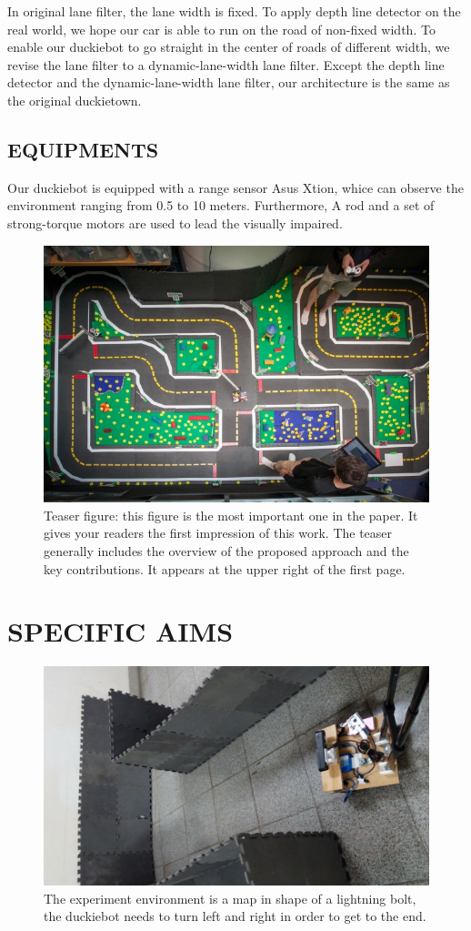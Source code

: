 \documentclass[letterpaper, 10 pt, conference]{ieeeconf}  %
\begin{document}
In original lane filter, the lane width is fixed. To apply depth line detector on the real world, we hope our car is able to run on the road of non-fixed width. To enable our duckiebot to go straight in the center of roads of different width, we revise the lane filter to a dynamic-lane-width lane filter. Except the depth line detector and the dynamic-lane-width lane filter, our architecture is the same as the original duckietown.


\subsection{EQUIPMENTS} 

Our duckiebot is equipped with a range sensor Asus Xtion, whice can observe the environment ranging from 0.5 to 10 meters. Furthermore, A rod and a set of strong-torque motors are used to lead the visually impaired.

\begin{figure}[t] %
\includegraphics[width=0.8\columnwidth]{duck}
\centering
\caption{Teaser figure: this figure is the most important one in the paper. It gives your readers the first impression of this work. The teaser generally includes the overview of the proposed approach and the key contributions. It appears at the upper right of the first page.}
\end{figure}

\section{SPECIFIC AIMS}


\begin{figure}[h!] %
\includegraphics[width=0.8\columnwidth]{map.jpg}
\centering
\caption{The experiment environment is a map in shape of a lightning bolt, the duckiebot needs to turn left and right in order to get to the end. 
}
\end{figure}
\end{document}
